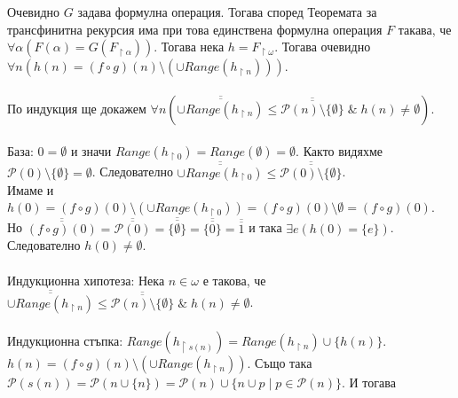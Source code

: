 \documentclass[12pt]{article}
\begin{document}
Очевидно \(G\) задава формулна операция.
Тогава според Теоремата за трансфинитна рекурсия има при това единствена формулна операция \(F\) такава, че \(\forall \alpha (F(\alpha) = G(F_{\restriction\alpha}))\).
Тогава нека \(h = F_{\restriction\omega}\).
Тогава очевидно \(\forall n (h(n) = (f \circ g)(n) \setminus (\cup Range(h_{\restriction n})))\).
\\
\vspace{1mm}
\\
По индукция ще докажем
\(\forall n (\overline{\overline{\cup Range(h_{\restriction n}) }} \leq \overline{\overline{\mathcal{P}(n) \setminus \{\emptyset\}}} \; \& \; h(n) \neq \emptyset)\).
\\
\vspace{1mm}
\\
База: \(0 = \emptyset\) и значи \(Range(h_{\restriction 0}) = Range(\emptyset) = \emptyset\). Както видяхме \\
\(\mathcal{P}(0) \setminus \{\emptyset\} = \emptyset\).
Следователно \(\overline{\overline{\cup Range(h_{\restriction 0}) }} \leq \overline{\overline{\mathcal{P}(0) \setminus \{\emptyset\}}}\). \\
Имаме и \(h(0) = (f \circ g)(0) \setminus (\cup Range(h_{\restriction 0}))
= (f \circ g)(0) \setminus \emptyset = (f \circ g)(0)\). \\
Но \(\overline{\overline{(f \circ g)(0)}} = \overline{\overline{\mathcal{P}(0)}}
= \overline{\overline{\{\emptyset\}}} = \overline{\overline{\{0\}}}
= \overline{\overline{1}}\) и така \(\exists e(h(0) = \{e\})\). \\
Следователно \(h(0) \neq \emptyset\).
\\
\vspace{1mm}
\\
Индукционна хипотеза: Нека \(n \in \omega\) е такова, че \\
\(\overline{\overline{\cup Range(h_{\restriction n}) }} \leq \overline{\overline{\mathcal{P}(n) \setminus \{\emptyset\}}} \; \& \; h(n) \neq \emptyset\).
\\
\vspace{1mm}
\\
Индукционна стъпка:
\(Range(h_{\restriction s(n)}) = Range(h_{\restriction n}) \cup \{h(n)\}\). \\
\(h(n) = (f \circ g)(n) \setminus (\cup Range(h_{\restriction n}))\).
Също така \\
\(\mathcal{P}(s(n)) = \mathcal{P}(n \cup \{n\}) = \mathcal{P}(n) \cup \{n \cup p \; | \; p \in  \mathcal{P}(n)\}\).
И тогава  \\
\end{document}
